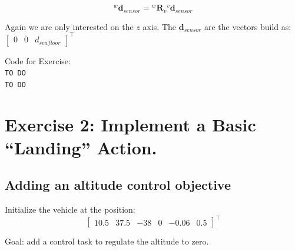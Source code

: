 \documentclass{article}
\begin{document}
 \begin{equation}
     {^{w}\boldsymbol{d}_{sensor}} = {^{w}\boldsymbol{R}_{v}} {^{v}\boldsymbol{d}_{sensor}}
 \end{equation}
 
 Again we are only interested on the $z$ axis. The $\boldsymbol{d}_{sensor}$ are the vectors build as:
 $\begin{bmatrix}0 & 0 & d_{seafloor} \end{bmatrix}^\top$
\\

\colorbox{mygray}{\parbox{0.9\textwidth}{Code for Exercise: \\
\texttt{TO DO}\\
\texttt{TO DO}
}}
\clearpage

\section{Exercise 2: Implement a Basic “Landing” Action.}
\subsection{Adding an altitude control objective}
Initialize the vehicle at the position:
\begin{displaymath}
\begin{bmatrix} 10.5 & 37.5 & -38 & 0 & -0.06 & 0.5 \end{bmatrix}^\top
\end{displaymath} 

Goal: add a control task to regulate the altitude to zero.
\end{document}
